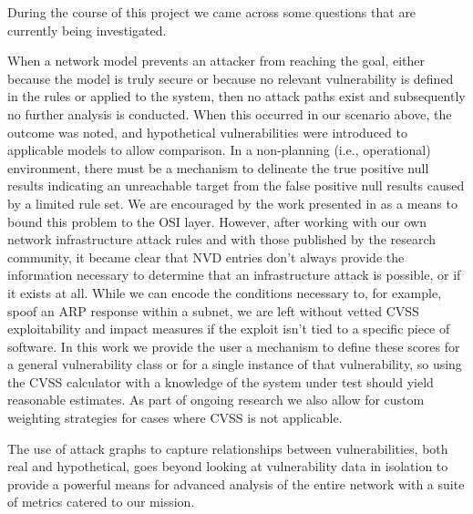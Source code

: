 During the course of this project we came across some questions that are currently being investigated.  

When a network model prevents an attacker from reaching the goal, either because the model is truly secure or because no relevant vulnerability is defined in the rules or applied to the system, then no attack paths exist and subsequently no further analysis is conducted. When this occurred in our scenario above, the outcome was noted, and hypothetical vulnerabilities were introduced  to applicable models to allow comparison. In a non-planning (i.e., operational) environment, there must be a mechanism to delineate the true positive null results indicating an unreachable target from the false positive null results caused by a limited rule set. We are encouraged by the work presented in \cite{Stan_Bitton_Ezrets_Dadon_Inokuchi_Ohta_Yamada_Yagyu_Elovici_Shabtai_2019} as a means to bound this problem to the OSI layer. However, after working with our own network infrastructure attack rules and with those published by the research community, it became clear that  NVD entries don't always provide the information necessary to determine that an infrastructure attack is possible, or if it exists at all. While we can encode the conditions necessary to, for example, spoof an ARP response within a subnet, we are left without vetted CVSS exploitability and impact measures if the exploit isn't tied to a specific piece of software. In this work we provide the user a mechanism to define these scores for a general vulnerability class or for a single instance of that vulnerability, so using the CVSS calculator with a knowledge of the system under test should yield reasonable estimates. As part of ongoing research we also allow for custom weighting strategies for cases where CVSS is not applicable.

The use of attack graphs to capture relationships between vulnerabilities, both real and hypothetical, goes beyond looking at vulnerability data in isolation to provide a powerful means for advanced analysis of the entire network with a suite of metrics catered to our mission.


 

